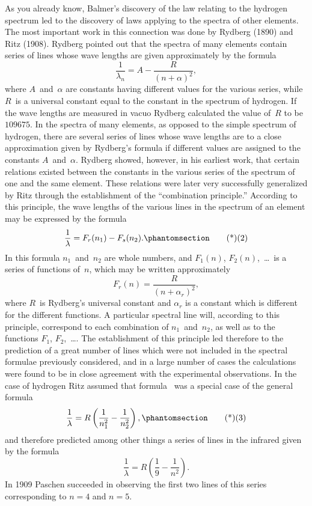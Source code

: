 As you already know, Balmer's discovery of the law relating to
the hydrogen spectrum led to the discovery of laws applying to
the spectra of other elements. The most important work in this
connection was done by Rydberg (1890) and Ritz (1908). Rydberg
pointed out that the spectra of many elements contain series of
lines whose wave lengths are given approximately by the formula
\[
\frac{1}{\lambda_{n}} = A - \frac{R}{(n + \alpha)^{2}},
\]
where $A$~and~$\alpha$ are constants having different values for the various
series, while $R$~is a universal constant equal to the constant in the
spectrum of hydrogen. If the wave lengths are measured in vacuo
Rydberg calculated the value of~$R$ to be~$109675$. In the spectra of
many elements, as opposed to the simple spectrum of hydrogen, there
are several series of lines whose wave lengths are to a close approximation
given by Rydberg's formula if different values are assigned to
the constants $A$~and~$\alpha$. Rydberg showed, however, in his earliest
work, that certain relations existed between the constants in the
various series of the spectrum of one and the same element. These
relations were later very successfully generalized by Ritz through
the establishment of the ``combination principle.'' According to
this principle, the wave lengths of the various lines in the spectrum
of an element may be expressed by the formula
\[
\frac{1}{\lambda} = F_{r}(n_{1}) - F_{s}(n_{2}).
\Tag{(2)}
\]
In this formula $n_{1}$~and~$n_{2}$ are whole numbers, and $F_{1}(n)$, $F_{2}(n)$,~\dots\ is
a series of functions of~$n$, which may be written approximately
\[
F_{r}(n) = \frac{R}{(n + \alpha_{r})^{2}},
\]
where $R$~is Rydberg's universal constant and $\alpha_{r}$ is a constant which
is different for the different functions. A particular spectral line will,
according to this principle, correspond to each combination of $n_{1}$~and~$n_{2}$,
as well as to the functions $F_{1}$, $F_{2}$,~\dots. The establishment of
this principle led therefore to the prediction of a great number of
lines which were not included in the spectral formulae previously
considered, and in a large number of cases the calculations were
found to be in close agreement with the experimental observations.
In the case of hydrogen Ritz assumed that formula~ was a special
case of the general formula
\[
\frac{1}{\lambda} = R\left(\frac{1}{n_{1}^{2}} - \frac{1}{n_{2}^{2}}\right),
\Tag{(3)}
\]
and therefore predicted among other things a series of lines in the
infra\Add{-}red given by the formula
\[
\frac{1}{\lambda} = R\left(\frac{1}{9} - \frac{1}{n^{2}}\right).
\]
In 1909 Paschen succeeded in observing the first two lines of this
series corresponding to $n = 4$ and $n = 5$.

